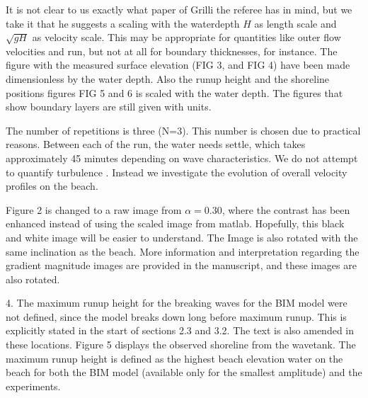 
It is not clear to us exactly what paper of Grilli the referee has in mind, but we take it that he suggests a scaling
with the waterdepth $H$ as length scale and $\sqrt{gH}$ as velocity scale. This may be appropriate for quantities like outer flow velocities and run, but not at all for boundary thicknesses, for instance.
The figure with the measured surface elevation (FIG 3, and  FIG 4) have been  made dimensionless  by the water depth. Also the runup height and the shoreline positions figures FIG 5 and 6 is scaled with the water depth. The figures that show boundary layers are still given with units. 

The number of repetitions is three (N=3). This number is chosen due to practical reasons. Between each of the run, the water needs settle, which takes approximately 45 minutes depending on wave characteristics. 
We do not attempt to quantify turbulence . Instead we investigate the evolution of overall velocity profiles on the beach.


Figure 2 is changed to a raw image from $\alpha=0.30$, where the contrast has been enhanced instead of using the scaled image from matlab. Hopefully, this black and white image will be easier to understand. The Image is also rotated with the same inclination as the beach. More information and interpretation regarding the gradient magnitude images are provided in the manuscript, and these images are also rotated.



4. The maximum runup height for the breaking waves for the BIM model were not defined, since the model breaks down long before maximum runup. This is explicitly stated in the start of sections 2.3 and 3.2.  The text is also amended in these locations. Figure 5 displays the observed shoreline from the wavetank. The maximum runup height is defined as the highest beach elevation water on the beach for both the BIM model (available only for the smallest amplitude) and the experiments. 

